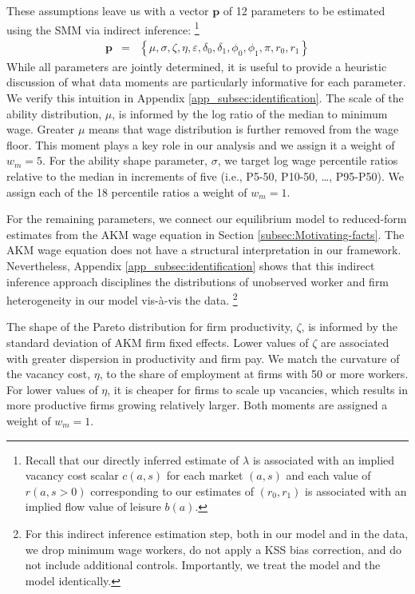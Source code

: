 These assumptions leave us with a vector $\mathbf{p}$ of 12 parameters to be estimated using the SMM via indirect inference:%
%
\footnote{Recall that our directly inferred estimate of $\lambda$ is associated with an implied vacancy cost scalar $c(a,s)$ for each market $(a,s)$ and each value of $r(a,s>0)$ corresponding to our estimates of $(r_0, r_1)$ is associated with an implied flow value of leisure $b(a)$.} %
%
\begin{eqnarray*}
  \mathbf{p} &=& \left\{ \mu , \sigma , \zeta , \eta , \varepsilon , \delta_0 , \delta_1 , \phi_0 , \phi_1 , \pi , r_{0} , r_{1} \right\}
\end{eqnarray*}
%
While all parameters are jointly determined, it is useful to provide a heuristic discussion of what data moments are particularly informative for each parameter. We verify this intuition in Appendix \ref{app_subsec:identification}. The scale of the ability distribution, $\mu$, is informed by the log ratio of the median to minimum wage. Greater $\mu$ means that wage distribution is further removed from the wage floor. This moment plays a key role in our analysis and we assign it a weight of $w_{m}=5$. For the ability shape parameter, $\sigma$, we target log wage percentile ratios relative to the median in increments of five (i.e., P5-50, P10-50, \ldots, P95-P50). We assign each of the 18 percentile ratios a weight of $w_{m}=1$.

For the remaining parameters, we connect our equilibrium model to reduced-form estimates from the AKM wage equation in Section \ref{subsec:Motivating-facts}. The AKM wage equation does not have a structural interpretation in our framework. Nevertheless, Appendix \ref{app_subsec:identification} shows that this indirect inference approach disciplines the distributions of unobserved worker and firm heterogeneity in our model vis-{\`{a}}-vis the data.%
%
\footnote{For this indirect inference estimation step, both in our model and in the data, we drop minimum wage workers, do not apply a KSS bias correction, and do not include additional controls. Importantly, we treat the model and the model identically.} %
%

The shape of the Pareto distribution for firm productivity, $\zeta$, is informed by the standard deviation of AKM firm fixed effects. Lower values of $\zeta$ are associated with greater dispersion in productivity and firm pay. We match the curvature of the vacancy cost, $\eta$, to the share of employment at firms with 50 or more workers. For lower values of $\eta$, it is cheaper for firms to scale up vacancies, which results in more productive firms growing relatively larger. Both moments are assigned a weight of $w_{m}=1$.

